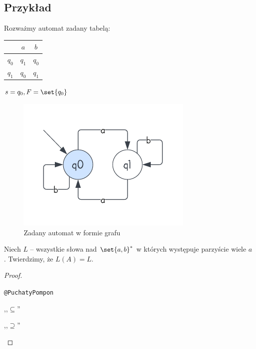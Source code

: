 \subsection{Przykład}
Rozważmy automat zadany tabelą:
\begin{center}
    \begin{tabular}{c|c c}
        & \(a\) & \(b\) \\
        \hline
         \(q_0\) & \(q_1\) & \(q_0\) \\
         \(q_1\) & \(q_0\) & \(q_1\) \\
    \end{tabular}
\end{center}
\( s = q_0, F = \set{q_0} \)

\begin{figure}[H]
    \centering
    \includegraphics[scale=0.75]{img/even-a-automaton.png}
    \caption{Zadany automat w formie grafu}
\end{figure}


Niech \( L \) -- wszystkie słowa nad \( \set{a, b}^* \) w których występuje parzyście wiele \( a \).
Twierdzimy, że \( L(A) = L \).

\begin{proof} \( \)

\texttt{@PuchatyPompon}

\begin{description}
    \item ,,\(\subseteq\)''
    
    \item ,,\(\supseteq\)''
\end{description}
\end{proof}